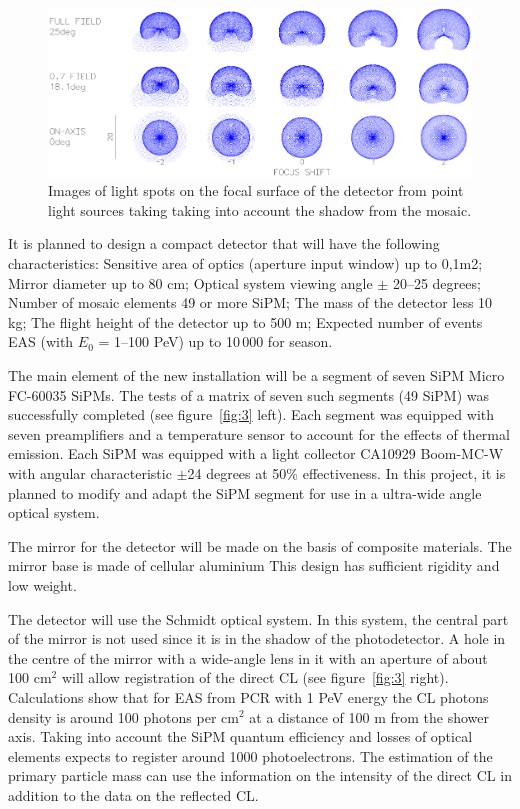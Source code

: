 \documentclass[a4paper,11pt]{article}
\begin{document}
\begin{figure}[htbp]
\centering
\includegraphics[width=.8\textwidth,trim=0 0 0 0,clip]{Sphere3spot.png}
\caption{\label{fig:spots} Images of light spots on the focal surface of the detector from point light sources taking taking into account the shadow from the mosaic.}
\end{figure}


It is planned to design a compact detector that will have the following characteristics:
Sensitive area of optics (aperture input window) up to 0,1m2;
Mirror diameter up to 80 cm;
Optical system viewing angle $\pm$ 20--25 degrees;
Number of mosaic elements 49 or more SiPM;
The mass of the detector less 10 kg;
The flight height of the detector up to 500 m;
Expected number of events EAS (with $E_0$ = 1--100 PeV) up to 10\,000 for season.

The main element of the new installation will be a segment of seven SiPM Micro FC-60035 SiPMs. The tests of a matrix of seven such segments (49 SiPM) was successfully completed (see figure~\ref{fig:3} left). Each segment was equipped with seven preamplifiers and a temperature sensor to account for the effects of thermal emission. Each SiPM was equipped with a light collector CA10929 Boom-MC-W with angular characteristic $\pm$24 degrees at 50\% effectiveness. In this project, it is planned to modify and adapt the SiPM segment for use in a ultra-wide angle optical system.

The mirror for the detector will be made on the basis of composite materials. The mirror base is made of cellular aluminium This design has sufficient rigidity and low weight.

The detector will use the Schmidt optical system. In this system, the central part of the mirror is not used since it is in the shadow of the photodetector. A hole in the centre of the mirror with a wide-angle lens in it with an aperture of about 100 cm$^2$ will allow registration of the direct CL (see figure~\ref{fig:3} right). Calculations show that for EAS from PCR with 1 PeV energy the CL photons density is around 100 photons per cm$^2$ at a distance of 100 m from the shower axis. Taking into account the SiPM quantum efficiency and losses of optical elements expects to register around 1000 photoelectrons. The estimation of the primary particle mass can use the information on the intensity of the direct CL in addition to the data on the reflected CL.
\end{document}
